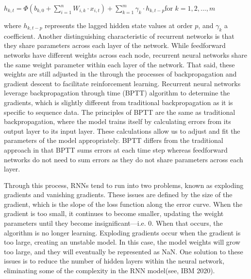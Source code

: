 \documentclass[a4paper,11pt,oneside]{book}
\begin{document}
\begin{center}
	$h_{k,t} =\Phi(b_{k,0} + \sum_{i=1}^{n} W_{i,k} \cdot x_{i,t}) + \sum_{k=1}^{m} \gamma_{k} \cdot h_{k,t-p}$for $k = 1,2,...,m$
\end{center}

where $h_{k,t-p}$ represents the lagged hidden state values at order $p$, and $\gamma_{k}$ a coefficient. Another distinguishing characteristic of recurrent networks is that they share parameters across each layer of the network. While feedforward networks have different weights across each node, recurrent neural networks share the same weight parameter within each layer of the network. That said, these weights are still adjusted in the through the processes of backpropagation and gradient descent to facilitate reinforcement learning. Recurrent neural networks leverage backpropagation through time (BPTT) algorithm to determine the gradients, which is slightly different from traditional backpropagation as it is specific to sequence data. The principles of BPTT are the same as traditional backpropagation, where the model trains itself by calculating errors from its output layer to its input layer. These calculations allow us to adjust and fit the parameters of the model appropriately. BPTT differs from the traditional approach in that BPTT sums errors at each time step whereas feedforward networks do not need to sum errors as they do not share parameters across each layer.\newline\newline

Through this process, RNNs tend to run into two problems, known as exploding gradients and vanishing gradients. These issues are defined by the size of the gradient, which is the slope of the loss function along the error curve. When the gradient is too small, it continues to become smaller, updating the weight parameters until they become insignificant—i.e. 0. When that occurs, the algorithm is no longer learning. Exploding gradients occur when the gradient is too large, creating an unstable model. In this case, the model weights will grow too large, and they will eventually be represented as NaN. One solution to these issues is to reduce the number of hidden layers within the neural network, eliminating some of the complexity in the RNN model(see, IBM 2020).
\end{document}
